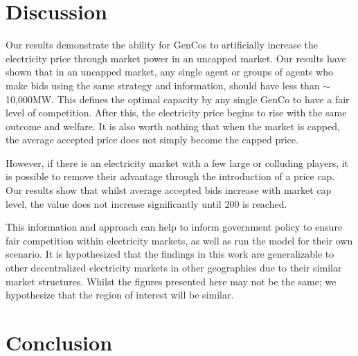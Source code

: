 
\section{Discussion}
\label{rl:sec:discussion}

Our results demonstrate the ability for GenCos to artificially increase the electricity price through market power in an uncapped market. Our results have shown that in an uncapped market, any single agent or groups of agents who make bids using the same strategy and information, should have less than ${\sim}$10,000MW. This defines the optimal capacity by any single GenCo to have a fair level of competition. After this, the electricity price begins to rise with the same outcome and welfare. It is also worth nothing that when the market is capped, the average accepted price does not simply become the capped price.

However, if there is an electricity market with a few large or colluding players, it is possible to remove their advantage through the introduction of a price cap. Our results show that whilst average accepted bids increase with market cap level, the value does not increase significantly until \textsterling$200$ is reached.


This information and approach can help to inform government policy to ensure fair competition within electricity markets, as well as run the model for their own scenario. It is hypothesized that the findings in this work are generalizable to other decentralized electricity markets in other geographies due to their similar market structures. Whilst the figures presented here may not be the same; we hypothesize that the region of interest will be similar.



\section{Conclusion}
\label{rl:sec:conclusion}

